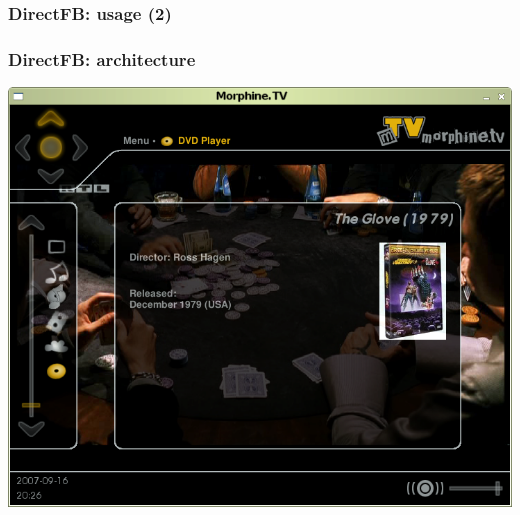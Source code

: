 \begin{frame}
  \frametitle{DirectFB: usage (2)}
  \frametitle{DirectFB: architecture}
  \begin{center}
    \includegraphics[height=0.8\textheight]{slides/sysdev-embedded-linux/directfb-morphine.png}
  \end{center}
\end{frame}

